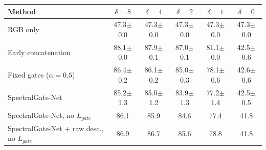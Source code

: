 \begin{tabular}{lccccc}
\toprule
Method & $\delta=8$ & $\delta=4$ & $\delta=2$ & $\delta=1$ & $\delta=0$ \\
\midrule
RGB only & 47.3$\pm$0.0 & 47.3$\pm$0.0 & 47.3$\pm$0.0 & 47.3$\pm$0.0 & 47.3$\pm$0.0 \\
Early concatenation & 88.1$\pm$0.0 & 87.9$\pm$0.1 & 87.0$\pm$0.1 & 81.1$\pm$0.0 & 42.5$\pm$0.6 \\
Fixed gates ($\alpha=0.5$) & 86.4$\pm$0.2 & 86.1$\pm$0.2 & 85.0$\pm$0.3 & 78.1$\pm$0.6 & 42.6$\pm$0.6 \\
SpectralGate-Net & 85.2$\pm$1.3 & 85.0$\pm$1.2 & 83.9$\pm$1.3 & 77.2$\pm$1.4 & 42.5$\pm$0.5 \\
SpectralGate-Net, no $L_{gate}$ & 86.1 & 85.9 & 84.6 & 77.4 & 41.8 \\
SpectralGate-Net + raw desc., no $L_{gate}$ & 86.9 & 86.7 & 85.6 & 78.8 & 41.8 \\
\bottomrule
\end{tabular}